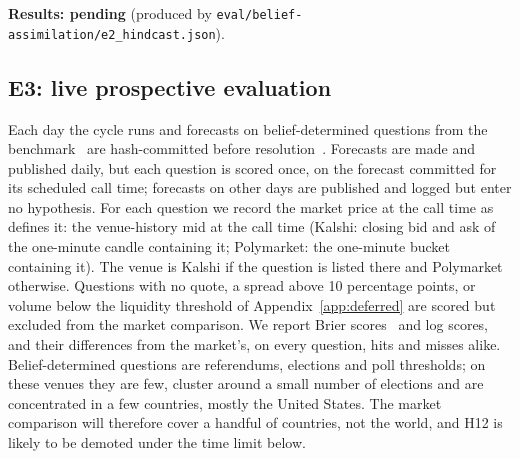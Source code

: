 \documentclass[10pt]{article}
\theoremstyle{remark}
\newcommand{\pending}[1]{\textbf{Results: pending} (produced by \nolinkurl{#1}).}
\begin{document}
\pending{eval/belief-assimilation/e2_hindcast.json}

\subsection{E3: live prospective evaluation}
\label{sec:e3}
Each day the cycle runs and forecasts on belief-determined questions from the benchmark~\cite{rw_bench} are hash-committed before resolution~\cite{rw_receipts}. Forecasts are made and published daily, but each question is scored once, on the forecast committed for its scheduled call time; forecasts on other days are published and logged but enter no hypothesis. For each question we record the market price at the call time as~\cite{rw_receipts} defines it: the venue-history mid at the call time (Kalshi: closing bid and ask of the one-minute candle containing it; Polymarket: the one-minute bucket containing it). The venue is Kalshi if the question is listed there and Polymarket otherwise. Questions with no quote, a spread above 10 percentage points, or volume below the liquidity threshold of Appendix~\ref{app:deferred} are scored but excluded from the market comparison. We report Brier scores~\cite{brier1950} and log scores, and their differences from the market's, on every question, hits and misses alike. Belief-determined questions are referendums, elections and poll thresholds; on these venues they are few, cluster around a small number of elections and are concentrated in a few countries, mostly the United States. The market comparison will therefore cover a handful of countries, not the world, and H12 is likely to be demoted under the time limit below.
\end{document}
